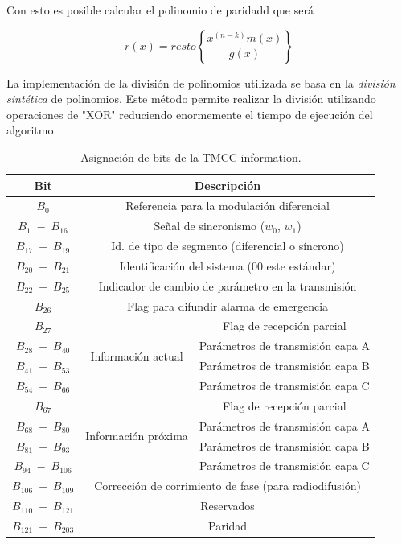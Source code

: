 Con esto es posible calcular el polinomio de paridadd que será 

\begin{equation}
r(x)= resto \left\{ \dfrac{x^{(n-k)}m(x)}{g(x)} \right\}
\end{equation}

La implementación de la división de polinomios utilizada se basa en la \textit{división sintética} de polinomios. Este método permite realizar la división utilizando operaciones de "XOR" reduciendo enormemente el tiempo de ejecución del algoritmo.


\begin{table}[h!]
\centering
\begin{tabular}{|c|c|c|}
\hline
\textbf{Bit} 	& \multicolumn{2}{|c|}{\textbf{Descripción}} \\
\hline
$B_0$ & \multicolumn{2}{|c|}{Referencia para la modulaci\'on diferencial} \\
 \hline
$B_1 \; - \; B_{16}$ & \multicolumn{2}{|c|}{Señal de sincronismo ($w_0$, $w_1$)} \\
 \hline
$B_{17} \; - \; B_{19}$ & \multicolumn{2}{|c|}{Id. de tipo de segmento (diferencial o síncrono)} \\
 \hline
$B_{20} \; - \; B_{21}$ & \multicolumn{2}{|c|}{Identificación del sistema (00 este estándar)} \\
 \hline
$B_{22} \; - \; B_{25}$ & \multicolumn{2}{|c|}{Indicador de cambio de parámetro en la transmisión} \\
 \hline
$B_{26}$ & \multicolumn{2}{|c|}{Flag para difundir alarma de emergencia} \\
 \hline
$B_{27}$ & \multirow{4}{*}{Informaci\'on actual} & Flag de recepción parcial\\
 \cline{3-3} \cline{1-1}
$B_{28} \; - \; B_{40}$ &  & Parámetros de transmisión capa A \\
 \cline{3-3} \cline{1-1}
 $B_{41} \; - \; B_{53}$ & & Parámetros de transmisión capa B \\
 \cline{3-3} \cline{1-1}
 $B_{54} \; - \; B_{66}$ &  & Parámetros de transmisión capa C \\
 \hline
 $B_{67}$ & \multirow{4}{*}{Informaci\'on pr\'oxima} & Flag de recepción parcial\\
 \cline{3-3} \cline{1-1}
$B_{68} \; - \; B_{80}$ &  & Parámetros de transmisión capa A \\
 \cline{3-3} \cline{1-1}
 $B_{81} \; - \; B_{93}$ & & Parámetros de transmisión capa B \\
 \cline{3-3} \cline{1-1}
 $B_{94} \; - \; B_{106}$ &  & Parámetros de transmisión capa C \\
 \hline
  $B_{106} \; - \; B_{109}$ &  \multicolumn{2}{|c|}{Correcci\'on de corrimiento de fase (para radiodifusi\'on)}  \\
 \hline
  $B_{110} \; - \; B_{121}$ &  \multicolumn{2}{|c|}{Reservados}  \\
 \hline
   $B_{121} \; - \; B_{203}$ &  \multicolumn{2}{|c|}{Paridad}  \\
 \hline  
\end{tabular}
\caption{\label{t:bits_TMCC} Asignación de bits de la TMCC information.}
\end{table}

